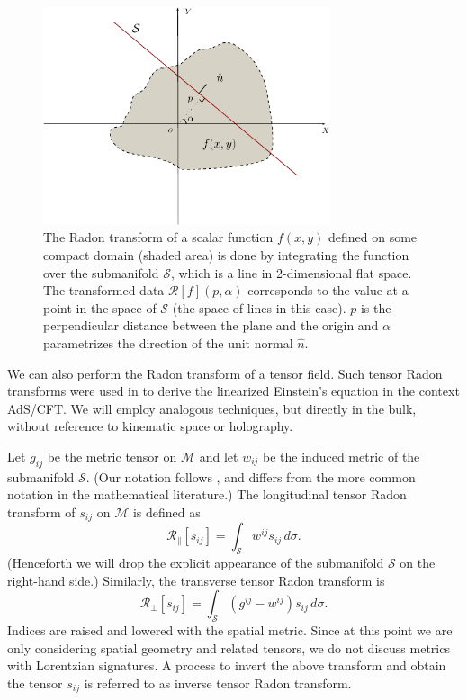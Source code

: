 \documentclass[%
preprint,
nofootinbib,
amsmath,amssymb,
aps,
prd,
showpacs,
superscriptaddress
]{revtex4-1}
\newcommand{\R}{\mathscr{R}}
\begin{document}
\begin{figure}
 \includegraphics[width=0.75\textwidth]{xraytransform.pdf}
\caption{The Radon transform of a scalar function $f(x,y)$ defined on some compact domain (shaded area) is done by integrating the function over the submanifold $\mathcal{S}$, which is a line in 2-dimensional flat space. The transformed data $\R[f](p,\alpha)$ corresponds to the value at a point in the space of $\mathcal{S}$ (the space of lines in this case). $p$ is the perpendicular distance between the plane and the origin and $\alpha$ parametrizes the direction of the unit normal $\hat{n}$.
}
\label{fig:xraytransform}
\end{figure}

We can also perform the Radon transform of a tensor field.
Such tensor Radon transforms were used in  \cite{Czech:2016tqr} to derive the linearized Einstein's equation in the context AdS/CFT. 
We will employ analogous techniques, but directly in the bulk, without reference to kinematic space or holography. 

Let $g_{ij}$ be the metric tensor on $\mathcal{M}$ and let $w_{ij}$ be the induced metric of the submanifold $\mathcal{S}$. 
(Our notation follows \cite{Czech:2016tqr}, and differs from the more common notation in the mathematical literature.)
The longitudinal tensor Radon transform of $s_{ij}$ on $\mathcal{M}$ is defined as
\begin{equation}
\R_{\parallel} [s_{ij}] = \int_{\mathcal{S}} w^{ij} s_{ij}\, d\sigma.
\label{eq:Rparallel}
\end{equation}
(Henceforth we will drop the explicit appearance of the submanifold $\mathcal{S}$ on the right-hand side.)
Similarly, the transverse tensor Radon transform is
\begin{equation}
\R_{\bot}[s_{ij}] = \int_{\mathcal{S}} (g^{ij}-w^{ij}) s_{ij}\, d\sigma.
\end{equation}
Indices are raised and lowered with the spatial metric. Since at this point we are only considering spatial geometry and related tensors, we do not discuss metrics with Lorentzian signatures. 
A process to invert the above transform and obtain the tensor $s_{ij}$ is referred to as inverse tensor Radon transform. 
\end{document}
